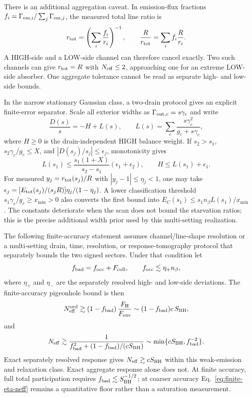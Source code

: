 \documentclass[12pt]{article}
\newcommand{\be}{\begin{equation}}
\newcommand{\ee}{\end{equation}}
\newcommand{\Neff}{N_{\rm eff}}
\begin{document}
There is an additional aggregation caveat.  In emission-flux fractions
$f_i=\Gamma_{{\rm em},i}/\sum_j\Gamma_{{\rm em},j}$, the measured total
line ratio is
\be
  r_{\rm tot}
  =\left(\sum_i\frac{f_i}{r_i}\right)^{-1},
  \qquad
  \frac{R}{r_{\rm tot}}
  =\sum_i f_i\frac{R}{r_i}.
\label{eq:aggregate-ratio}
\ee
A HIGH-side and a LOW-side channel can therefore cancel exactly.  Two
such channels can give $r_{\rm tot}=R$ with $\Neff\leq2$, approaching
one for an extreme LOW-side absorber.  One aggregate tolerance cannot
be read as separate high- and low-side bounds.

In the narrow stationary Gaussian class, a two-drain protocol gives an
explicit finite-error separator.  Scale all exterior widths as
$\Gamma_{{\rm out},c}=s\gamma_c$ and write
\be
  \frac{D(s)}{s}=-H+L(s),\qquad
  L(s)=\sum_c\frac{s\gamma_c^2}{g_c+s\gamma_c},
\ee
where $H\geq0$ is the drain-independent HIGH balance weight.  If
$s_2>s_1$, $s_2\gamma_c/g_c\leq X$, and
$|D(s_j)/s_j|\leq\epsilon_j$, monotonicity gives
\be
  L(s_1)\leq
  \frac{s_1(1+X)}{s_2-s_1}(\epsilon_1+\epsilon_2),
  \qquad
  H\leq L(s_1)+\epsilon_1.
\label{eq:two-drain-finite}
\ee
For measured $y_j=r_{\rm tot}(s_j)/R$ with
$|y_j-1|\leq\eta_j<1$, one may take
$\epsilon_j=[E_{\rm tot}(s_j)/(s_jR)]\eta_j/(1-\eta_j)$.
A lower classification threshold
$s_1\gamma_c/g_c\geq x_{\min}>0$ also converts the first bound into
$E_C(s_1)\leq s_1n_\beta L(s_1)/x_{\min}$.  The constants deteriorate
when the scan does not bound the starvation ratios; this is the precise
additional width prior used by this multi-setting realization.

The following
finite-accuracy statement assumes channel/line-shape resolution or a
multi-setting drain, time, resolution, or response-tomography protocol
that separately bounds the two signed sectors.  Under that condition let
\be
  f_{\rm bad}=f_{\rm occ}+F_{\rm coll},
  \qquad
  f_{\rm occ}\lesssim\eta_+ n_\beta,
\ee
where $\eta_+$ and $\eta_-$ are the separately resolved high- and
low-side deviations.  The finite-accuracy pigeonhole bound is then
\be
  \Neff^{\rm ord}
  \gtrsim
  (1-f_{\rm bad})\,\frac{F_{\rm H}}{F_{\rm env}}
  \sim
  (1-f_{\rm bad})c\,S_{\rm BH},
\ee
and
\be
  \Neff
  \gtrsim
  \frac{1}{f_{\rm bad}^2+(1-f_{\rm bad})/(cS_{\rm BH})}
  \sim
  \min\{cS_{\rm BH},f_{\rm bad}^{-2}\}.
\label{eq:finite-eta-neff}
\ee
Exact separately resolved response gives $\Neff\gtrsim cS_{\rm BH}$
within this weak-emission and relaxation class.  Exact aggregate
response alone does not.  At finite accuracy, full total
participation requires $f_{\rm bad}\lesssim S_{\rm BH}^{-1/2}$; at
coarser accuracy Eq.~\eqref{eq:finite-eta-neff} remains a quantitative
floor rather than a saturation measurement.
\end{document}
